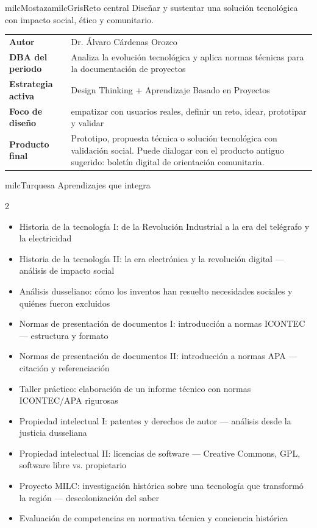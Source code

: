 \documentclass[11pt,letterpaper]{article}
\begin{document}
\begin{softbox}{milcMostaza}{milcGris}{Reto central}
Diseñar y sustentar una solución tecnológica con impacto social, ético y comunitario.
\end{softbox}

\begin{tabularx}{\textwidth}{>{\bfseries}p{3.4cm}X}
\rowcolor{milcMagenta!12}Autor & Dr. Álvaro Cárdenas Orozco\\
DBA del periodo & Analiza la evolución tecnológica y aplica normas técnicas para la documentación de proyectos\\
Estrategia activa & Design Thinking + Aprendizaje Basado en Proyectos\\
Foco de diseño & empatizar con usuarios reales, definir un reto, idear, prototipar y validar\\
Producto final & Prototipo, propuesta técnica o solución tecnológica con validación social. Puede dialogar con el producto antiguo sugerido: boletín digital de orientación comunitaria.\\
\end{tabularx}

\begin{titlebox}{milcTurquesa}
Aprendizajes que integra
\end{titlebox}
\begin{multicols}{2}
\begin{itemize}[leftmargin=*]
\item Historia de la tecnología I: de la Revolución Industrial a la era del telégrafo y la electricidad
\item Historia de la tecnología II: la era electrónica y la revolución digital — análisis de impacto social
\item Análisis dusseliano: cómo los inventos han resuelto necesidades sociales y quiénes fueron excluidos
\item Normas de presentación de documentos I: introducción a normas ICONTEC — estructura y formato
\item Normas de presentación de documentos II: introducción a normas APA — citación y referenciación
\item Taller práctico: elaboración de un informe técnico con normas ICONTEC/APA rigurosas
\item Propiedad intelectual I: patentes y derechos de autor — análisis desde la justicia dusseliana
\item Propiedad intelectual II: licencias de software — Creative Commons, GPL, software libre vs. propietario
\item Proyecto MILC: investigación histórica sobre una tecnología que transformó la región — descolonización del saber
\item Evaluación de competencias en normativa técnica y conciencia histórica
\end{itemize}
\end{multicols}
\end{document}
